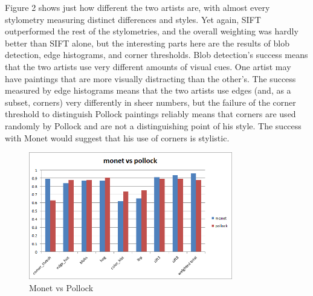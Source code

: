 \documentclass{article}
\begin{document}
  Figure 2 shows just how different the two
  artists are, with almost every stylometry measuring distinct differences and
  styles. Yet again, SIFT outperformed the rest of the stylometries, and the
  overall weighting was hardly better than SIFT alone, but the interesting parts
  here are the results of blob detection, edge histograms, and corner
  thresholds. Blob detection's success means that the two artists use very
  different amounts of visual cues. One artist may have paintings that are more
  visually distracting than the other's. The success measured by edge histograms
  means that the two artists use edges (and, as a subset, corners) very
  differently in sheer numbers, but the failure of the corner threshold to
  distinguish Pollock paintings reliably means that corners are used randomly by
  Pollock and are not a distinguishing point of his style. The success with
  Monet would suggest that his use of corners is stylistic.
  \begin{figure}[h!]
    \begin{center}
      \includegraphics[width=3.5in]{graphs/monet_pollock.png}
      \caption{Monet vs Pollock}
    \end{center}
  \end{figure} \\
\end{document}
